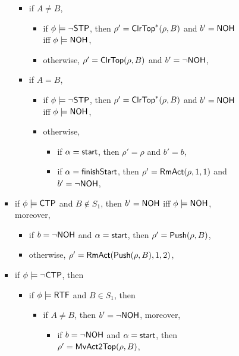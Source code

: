 \begin{itemize}
\begin{itemize}
\begin{itemize}
\begin{itemize}
\begin{itemize}
				\begin{itemize}
					\item if $A \neq B$, 
					\begin{itemize}
						\item if $\phi\models \neg {\sf STP}$, then $\rho' = \mathsf{ClrTop}^*(\rho, B)$ and $b' = {\sf NOH}$ iff $\phi \models {\sf NOH}$, 
						\item otherwise, $\rho' = \mathsf{ClrTop}(\rho, B)$ and $b' = \neg {\sf NOH}$, 
					\end{itemize}
					\item if $A = B$, 
					\begin{itemize}
						\item if $\phi \models \neg {\sf STP}$, then $\rho' = \mathsf{ClrTop}^*(\rho, B)$ and $b' = {\sf NOH}$ iff $\phi \models {\sf NOH}$, 
						\item otherwise, 
						\begin{itemize}
							\item if $\alpha = {\mathsf{start} }$, then $\rho' = \rho$ and $b' = b$,
							\item if $\alpha = {\mathsf{finishStart} }$, then $\rho' = \mathsf{RmAct}(\rho, 1, 1)$ and $b' = \neg{\sf NOH}$,
						\end{itemize}
					\end{itemize}
				\end{itemize}
				\item if $\phi \models {\sf CTP}$ and $B\notin S_1$, then $b' = {\sf NOH}$ iff $\phi \models {\sf NOH}$, moreover,
				\begin{itemize}
					\item if $b = \neg {\sf NOH}$ and $\alpha = {\mathsf{start} }$, then $\rho'=\mathsf{Push}(\rho, B)$,
					\item otherwise, $\rho' = \mathsf{RmAct}(\mathsf{Push}(\rho, B), 1, 2)$, 
				\end{itemize}
				\item if $\phi \models \neg {\sf CTP}$, then
				\begin{itemize}
					\item if $\phi \models {\sf RTF}$ and $B \in S_1$, then
					\begin{itemize}
                					\item if $A \neq B$, then $b' = \neg {\sf NOH}$, moreover, 
                					\begin{itemize}
                						\item if $b = \neg {\sf NOH}$ and $\alpha = {\mathsf{start} }$, then $\rho'=\mathsf{MvAct2Top}(\rho, B)$,

\end{itemize}
\end{itemize}
\end{itemize}
\end{itemize}
\end{itemize}
\end{itemize}
\end{itemize}
\end{itemize}

